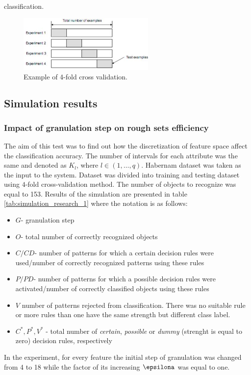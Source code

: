 classification. 
\begin{figure}[H]
    \begin{center}
        \includegraphics[width=0.6\textwidth]{fig/cross_validation.jpg}
    \end{center}
    \caption{Example of 4-fold cross validation.}
    \label{fig:cross_validation}
\end{figure}
\label{cha:Simulation_environment}
\subsection{Simulation results}
\label{cha:Simulation_results}
\subsubsection{Impact of granulation step on rough sets efficiency}
\label{cha:Simulation_reaearch_1}
The aim of this test was to find out how the discretization of feature space
affect the classification accuracy. The number of intervals for each
attribute was the same and denoted as $K_l$, where $l \in (1, \ldots, q)$.
Habernam dataset was taken as the input to the system. Dataset was divided into
training and testing dataset using $4$-fold cross-validation method. The number
of objects to recognize was equal to 153.
Results of the simulation are presented in table
\ref{tab:simulation_research_1} where the notation is as follows:
\begin{itemize}
    \item $G$- granulation step
    \item $O$- total number of correctly recognized objects
    \item $C/CD$- number of patterns for which a certain decision rules were
        used/number of correctly recognized patterns using these rules 
    \item $P/PD$- number of patterns for which a possible decision rules were
        activated/number of correctly classified objects using these rules
    \item $V$ number of patterns rejected from classification. There was no
        suitable rule or more rules than one have the same strength but different class
        label.
    \item $C^*, P^*, V^*$ - total number of \textit{certain}, \textit{possible}
        or \textit{dummy} (strenght is equal to zero) decision rules, respectively
\end{itemize}
In the experiment, for every feature the initial step of granulation was
changed from 4 to 18 while the factor of its increasing $\epsilona$  was equal 
to one.

